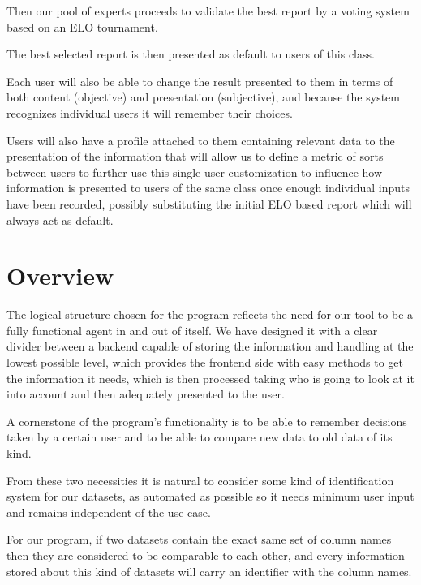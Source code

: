 Then our pool of experts proceeds to validate the best report by a voting system based on an ELO tournament. 

The best selected report is then presented as default to users of this class. 

Each user will also be able to change the result presented to them in terms of both content (objective) and presentation (subjective), and because the system recognizes individual users it will remember their choices.

Users will also have a profile attached to them containing relevant data to the presentation of the information that will allow us to define a metric of sorts between users to further use this single user customization to influence how information is presented to users of the same class once enough individual inputs have been recorded, possibly substituting the initial ELO based report which will always act as default.


\section{Overview}
\label{cap1:sec:overview}

The logical structure chosen for the program reflects the need for our tool to be a fully functional agent in and out of itself. We have designed it with a clear divider between a backend capable of storing the information and handling at the lowest possible level, which provides the frontend side with easy methods to get the information it needs, which is then processed taking who is going to look at it into account and then adequately presented to the user.

A cornerstone of the program's functionality is to be able to remember decisions taken by a certain user and to be able to compare new data to old data of its kind.

From these two necessities it is natural to consider some kind of identification system for our datasets, as automated as possible so it needs minimum user input and remains independent of the use case.

For our program, if two datasets contain the exact same set of column names then they are considered to be comparable to each other, and every information stored about this kind of datasets will carry an identifier with the column names.


